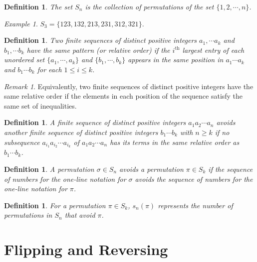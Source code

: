 \documentclass[11pt,letterpaper,twoside,english]{article}
\theoremstyle{theorem}
\newtheorem{definition}[theorem]{Definition}
\theoremstyle{remark}
\newtheorem{remark}{Remark}
\newtheorem{example}{Example}
\begin{document}
\begin{definition}
The set $S_n$ is the collection of permutations of the set $\{1,2,\cdots, n\}$. 
\end{definition}

\begin{example}
$S_3=\{123,132,213,231,312,321\}$. 
\end{example}








\begin{definition}
Two finite sequences of distinct positive integers $a_1,\cdots a_k$ and $b_1,\cdots b_k$ have the same pattern (or relative order) if the $i^\text{th}$ largest entry of each unordered set $\{a_1,\cdots,a_k\}$ and $\{b_1,\cdots, b_k\}$ appears in the same position in $a_1\cdots a_k$ and $b_1\cdots b_k$ for each $1\le i\le k$. 
\end{definition}

\begin{remark}
Equivalently, two finite sequences of distinct positive integers have the same relative order if the elements in each position of the sequence satisfy the same set of inequalities.
\end{remark}

\begin{definition}
A finite sequence of distinct positive integers $a_1a_2\cdots a_n$ avoids another finite sequence of distinct positive integers $b_1\cdots b_k$ with $n\ge k$ if no subsequence $a_{i_1}a_{i_2}\cdots a_{i_k}$ of $a_1a_2\cdots a_n$ has its terms in the same relative order as $b_1\cdots b_k$. 
\end{definition}


\begin{definition} 
A permutation $\sigma\in S_n$ avoids a permutation $\pi\in S_k$ if the sequence of numbers for the one-line notation for $\sigma$ avoids the sequence of numbers for the one-line notation for $\pi$.
\end{definition}

\begin{definition}
For a permutation $\pi\in S_k$, $s_n(\pi)$ represents the number of permutations in $S_n$ that avoid $\pi$. 
\end{definition}



\section{Flipping and Reversing}
\end{document}
